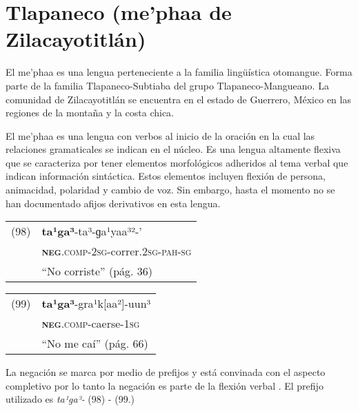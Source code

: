 \section*{Tlapaneco (me’phaa de Zilacayotitlán)}

\noindent El me’phaa es una lengua perteneciente a la familia lingüística otomangue. Forma parte de la familia Tlapaneco-Subtiaba del grupo Tlapaneco-Mangueano. La comunidad de Zilacayotitlán se encuentra en el estado de Guerrero, México en las regiones de la montaña y la costa chica. 

El me'phaa es una lengua con verbos al inicio de la oración en la cual las relaciones gramaticales se indican en el núcleo. Es una lengua altamente flexiva que se caracteriza por tener elementos morfológicos adheridos al tema verbal que indican información sintáctica. Estos elementos incluyen flexión de persona, animacidad, polaridad y cambio de voz. Sin embargo, hasta el momento no se han documentado afijos derivativos en esta lengua. \vspace{0.5cm}

{\setmainfont{Charis SIL} 

\begin{tabular}{ll}
(98) & \textbf{ta¹ga³}-ta³-ɡa¹yaa³²-’\\
& \textsc{\textbf{neg}.comp-2sg}-correr.\textsc{2sg-pah-sg}\\
& ``No corriste'' (pág. 36)
\end{tabular} \vspace{0.5cm}

\begin{tabular}{ll}
(99) & \textbf{ta¹ga³}-gra¹k[aa²]-uun³ \\
& \textsc{\textbf{neg}.comp}-caerse-\textsc{1sg} \\
& ``No me caí'' (pág. 66)
\end{tabular} \vspace{0.5cm}

}

La negación se marca por medio de prefijos y está convinada con el aspecto completivo por lo tanto la negación es parte de la flexión verbal \textcolor{MidnightBlue}{\citep{Tlapaneco}}. El prefijo utilizado es {\setmainfont{Charis SIL} \textit{ta¹ga³-}} (98) - (99.)